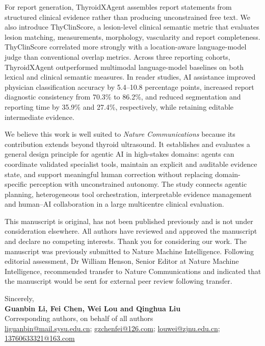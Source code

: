\documentclass[10pt]{article}
\begin{document}
For report generation, ThyroidXAgent assembles report statements from structured clinical evidence rather than producing unconstrained free text. We also introduce ThyClinScore, a lesion-level clinical semantic metric that evaluates lesion matching, measurements, morphology, vascularity and report completeness. ThyClinScore correlated more strongly with a location-aware language-model judge than conventional overlap metrics. Across three reporting cohorts, ThyroidXAgent outperformed multimodal language-model baselines on both lexical and clinical semantic measures. In reader studies, AI assistance improved physician classification accuracy by 5.4--10.8 percentage points, increased report diagnostic consistency from 70.3\% to 86.2\%, and reduced segmentation and reporting time by 35.9\% and 27.4\%, respectively, while retaining editable intermediate evidence.

We believe this work is well suited to \textit{Nature Communications} because its contribution extends beyond thyroid ultrasound. It establishes and evaluates a general design principle for agentic AI in high-stakes domains: agents can coordinate validated specialist tools, maintain an explicit and auditable evidence state, and support meaningful human correction without replacing domain-specific perception with unconstrained autonomy. The study connects agentic planning, heterogeneous tool orchestration, interpretable evidence management and human--AI collaboration in a large multicentre clinical evaluation.

This manuscript is original, has not been published previously and is not under consideration elsewhere. All authors have reviewed and approved the manuscript and declare no competing interests. Thank you for considering our work. The manuscript was previously submitted to Nature Machine Intelligence. Following editorial assessment, Dr William Henson, Senior Editor at Nature Machine Intelligence, recommended transfer to Nature Communications and indicated that the manuscript would be sent for external peer review following transfer.

\vspace{4pt}
Sincerely,\\[6pt]
\textbf{Guanbin Li, Fei Chen, Wei Lou and Qinghua Liu}\\
Corresponding authors, on behalf of all authors\\
\href{mailto:liguanbin@mail.sysu.edu.cn}{liguanbin@mail.sysu.edu.cn};
\href{mailto:gzchenfei@126.com}{gzchenfei@126.com};
\href{mailto:louwei@zjnu.edu.cn}{louwei@zjnu.edu.cn};
\href{mailto:13760633321@163.com}{13760633321@163.com}
\end{document}
